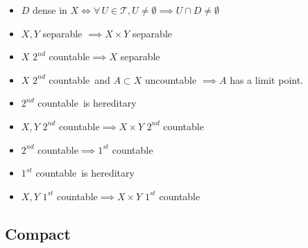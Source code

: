 \documentclass[letterpaper,12pt,fleqn]{article}
\newcommand{\T}{\mathscr{T}}
\renewcommand{\sc}{\(2^{nd}\) countable}
\newcommand{\fc}{\(1^{st}\) countable}
\begin{document}
\begin{itemize}
\item \(D\) dense in \(X\iff\forall\,U\in\T,U\ne\emptyset\implies U\cap D\ne\emptyset\)

\item \(X,Y\) separable \(\implies X\times Y\) separable

\item \(X\) \sc\(\implies X\) separable

\item \(X\) \sc\ and \(A\subset X\) uncountable \(\implies A\) has a limit point.

\item \sc\ is hereditary

\item \(X,Y\) \sc \(\implies X\times Y\) \sc

\item \sc\(\implies\)\fc

\item \fc\ is hereditary

\item \(X,Y\) \fc \(\implies X\times Y\) \fc
\end{itemize}

\newpage

\subsection*{Compact}
\end{document}
